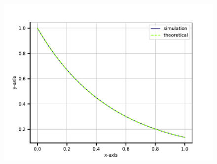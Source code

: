 \documentclass[journal]{IEEEtran}
\begin{document}
\begin{figure}[h!]
   \centering
   \includegraphics[width=0.7\columnwidth]{figs/fig.pdf}
\end{figure}
\end{document}
